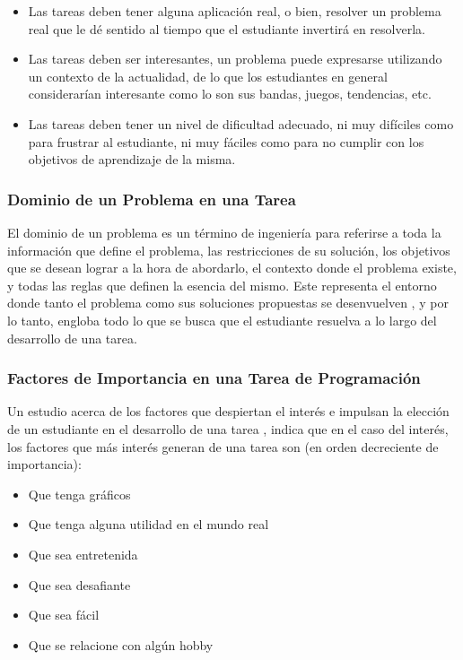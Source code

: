 \documentclass[letterpaper,12pt]{article}
\begin{document}
\begin{itemize}
  \item Las tareas deben tener alguna aplicación real, o bien, resolver un problema real que le dé sentido al tiempo que el estudiante invertirá en resolverla.
  \item Las tareas deben ser interesantes, un problema puede expresarse utilizando un contexto de la actualidad, de lo que los estudiantes en general considerarían interesante como lo son sus bandas, juegos, tendencias, etc.
  \item Las tareas deben tener un nivel de dificultad adecuado, ni muy difíciles como para frustrar al estudiante, ni muy fáciles como para no cumplir con los objetivos de aprendizaje de la misma.
\end{itemize}

\subsubsection{Dominio de un Problema en una Tarea}

El dominio de un problema es un término de ingeniería para referirse a toda la información que define el problema, las restricciones de su solución, los objetivos que se desean lograr a la hora de abordarlo, el contexto donde el problema existe, y todas las reglas que definen la esencia del mismo. Este representa el entorno donde tanto el problema como sus soluciones propuestas se desenvuelven \cite{ProblemDomain}, y por lo tanto, engloba todo lo que se busca que el estudiante resuelva a lo largo del desarrollo de una tarea.

\subsubsection{Factores de Importancia en una Tarea de Programación}

Un estudio acerca de los factores que despiertan el interés e impulsan la elección de un estudiante en el desarrollo de una tarea \cite{10.5555/1968521.1968545}, indica que en el caso del interés, los factores que más interés generan de una tarea son (en orden decreciente de importancia):

\begin{itemize}
  \item Que tenga gráficos
  \item Que tenga alguna utilidad en el mundo real
  \item Que sea entretenida
  \item Que sea desafiante
  \item Que sea fácil
  \item Que se relacione con algún hobby
\end{itemize}
\end{document}

